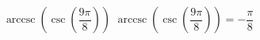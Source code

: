  {$\operatorname{arccsc}\left(\csc\left(\dfrac{9\pi}{8}\right) \right)$ }
{ $\operatorname{arccsc}\left(\csc\left(\dfrac{9\pi}{8}\right) \right) = -\dfrac{\pi}{8}$ }
